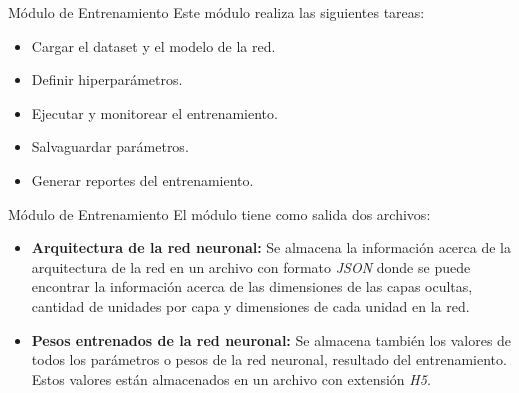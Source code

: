 \documentclass[10pt]{beamer}
\begin{document}

\begin{frame}{Módulo de Entrenamiento}
    Este módulo realiza las siguientes tareas:

    \begin{itemize}
        \item Cargar el dataset y el modelo de la red.
        \item Definir hiperparámetros.
        \item Ejecutar y monitorear el entrenamiento.
        \item Salvaguardar parámetros.
        \item Generar reportes del entrenamiento.
    \end{itemize}
\end{frame}

\begin{frame}{Módulo de Entrenamiento}
    El módulo tiene como salida dos archivos:

    \begin{itemize}
        \item \textbf{Arquitectura de la red neuronal:} Se almacena la información acerca de la arquitectura de la red en un archivo con formato \emph{JSON} donde se puede encontrar la información acerca de las dimensiones de las capas ocultas, cantidad de unidades por capa y dimensiones de cada unidad en la red.
        \item \textbf{Pesos entrenados de la red neuronal:} Se almacena también los valores de todos los parámetros o pesos de la red neuronal, resultado del entrenamiento. Estos valores están almacenados en un archivo con extensión \emph{H5}. 
    \end{itemize}

\end{frame}
\end{document}
